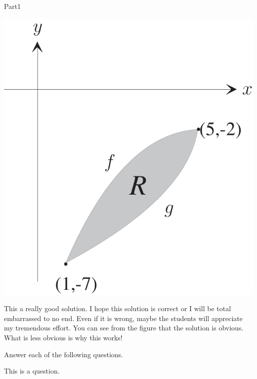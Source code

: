 \documentclass[12pt]{article}
\begin{document}
\begin{exam}[Part I.]{Part1}
\begin{problem}[7]
\begin{splitsolution}[1.25in]
\begin{panel}\relax
\includegraphics[scale=.2]{fig1}
\end{panel}
\begin{solution}
This a really good  solution. I hope this solution is correct or I will be total
embarrassed to no end. Even if it is wrong, maybe the students will appreciate
my tremendous effort. You can see from the figure that the solution is obvious.
What is less obvious is why this works!
\end{solution}
\end{splitsolution}
\end{problem}



\begin{problem*}[10ea]
Answer each of the following questions.
\begin{parts}
\item This is a question.




\end{parts}
\end{problem*}
\end{exam}
\end{document}
